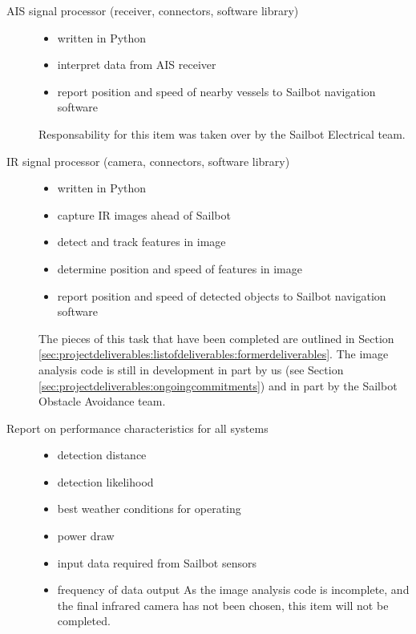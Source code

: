 \begin{description}
\item[AIS signal processor (receiver, connectors, software library)] \hfill
\begin{itemize}
\item written in Python
\item interpret data from AIS receiver
\item report position and speed of nearby vessels to Sailbot navigation software
\end{itemize}
Responsability for this item was taken over by the Sailbot Electrical team.

\item[IR signal processor (camera, connectors, software library)] \hfill
\begin{itemize}
\item written in Python
\item capture IR images ahead of Sailbot
\item detect and track features in image
\item determine position and speed of features in image
\item report position and speed of detected objects to Sailbot navigation software
\end{itemize}
The pieces of this task that have been completed are outlined in Section \ref{sec:projectdeliverables:listofdeliverables:formerdeliverables}. The image analysis code is still in development in part by us (see Section \ref{sec:projectdeliverables:ongoingcommitments}) and in part by the Sailbot Obstacle Avoidance team.

\item[Report on performance characteristics for all systems] \hfill
\begin{itemize}
\item detection distance
\item detection likelihood
\item best weather conditions for operating
\item power draw
\item input data required from Sailbot sensors
\item frequency of data output
As the image analysis code is incomplete, and the final infrared camera has not been chosen, this item will not be completed.

\end{itemize}
\end{description}

